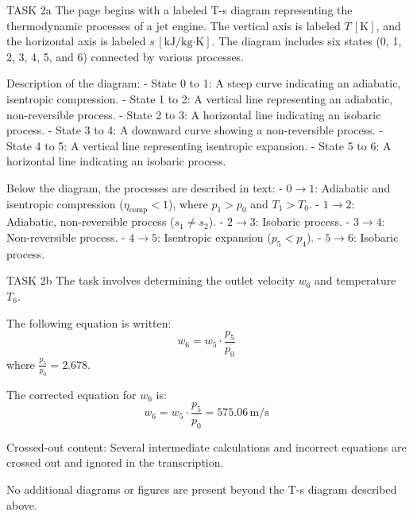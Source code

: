 TASK 2a  
The page begins with a labeled T-s diagram representing the thermodynamic processes of a jet engine. The vertical axis is labeled \( T \, [\text{K}] \), and the horizontal axis is labeled \( s \, [\text{kJ/kg·K}] \). The diagram includes six states (0, 1, 2, 3, 4, 5, and 6) connected by various processes.  

Description of the diagram:  
- State 0 to 1: A steep curve indicating an adiabatic, isentropic compression.  
- State 1 to 2: A vertical line representing an adiabatic, non-reversible process.  
- State 2 to 3: A horizontal line indicating an isobaric process.  
- State 3 to 4: A downward curve showing a non-reversible process.  
- State 4 to 5: A vertical line representing isentropic expansion.  
- State 5 to 6: A horizontal line indicating an isobaric process.  

Below the diagram, the processes are described in text:  
- \( 0 \to 1 \): Adiabatic and isentropic compression (\( \eta_{\text{comp}} < 1 \)), where \( p_1 > p_0 \) and \( T_1 > T_0 \).  
- \( 1 \to 2 \): Adiabatic, non-reversible process (\( s_1 \neq s_2 \)).  
- \( 2 \to 3 \): Isobaric process.  
- \( 3 \to 4 \): Non-reversible process.  
- \( 4 \to 5 \): Isentropic expansion (\( p_5 < p_4 \)).  
- \( 5 \to 6 \): Isobaric process.  

TASK 2b  
The task involves determining the outlet velocity \( w_6 \) and temperature \( T_6 \).  

The following equation is written:  
\[
w_6 = w_5 \cdot \frac{p_5}{p_0}
\]  
where \( \frac{p_5}{p_0} = 2.678 \).  

The corrected equation for \( w_6 \) is:  
\[
w_6 = w_5 \cdot \frac{p_5}{p_0} = 575.06 \, \text{m/s}
\]  

Crossed-out content: Several intermediate calculations and incorrect equations are crossed out and ignored in the transcription.  

No additional diagrams or figures are present beyond the T-s diagram described above.
